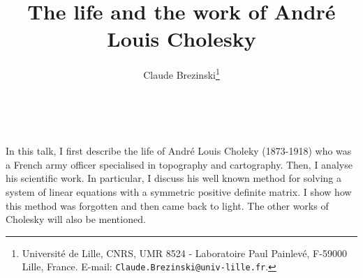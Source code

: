 \documentclass[12pt]{article}
\date{~}
\title{The life and the work of Andr\'{e} Louis Cholesky}
\author{Claude Brezinski\thanks{Universit\'{e} de Lille, CNRS, UMR 8524 - Laboratoire Paul Painlev\'{e},
F-59000 Lille, France. E-mail: {\tt Claude.Brezinski@univ-lille.fr}.}
}
\begin{document}
\maketitle

In this talk, I first describe the life of Andr\'{e} Louis Choleky (1873-1918) who was a French army officer specialised in topography and cartography. Then, I analyse his scientific work. In particular, I discuss his well known method for solving a system of linear equations with a symmetric positive definite matrix. I show how this method was forgotten and then came back to light. The other works of Cholesky will also be mentioned.
\end{document}
